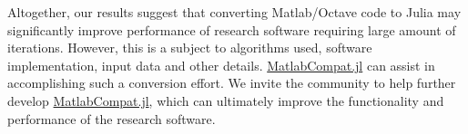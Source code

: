 Altogether, our results suggest that converting Matlab/Octave code to Julia may significantly improve performance of research software requiring large amount of iterations. However, this is a subject to algorithms used, software implementation, input data and other details. \href{https://github.com/MatlabCompat/MatlabCompat.jl}{MatlabCompat.jl} can assist in accomplishing such a conversion effort. We invite the community to help further develop \href{https://github.com/MatlabCompat/MatlabCompat.jl}{MatlabCompat.jl}, which can ultimately improve the functionality and performance of the research software.